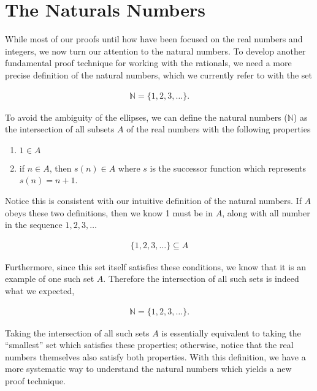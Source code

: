 \documentclass[twoside]{report}
\begin{document}
\section{The Naturals Numbers}

While most of our proofs until how have been focused on the real numbers and integers, we now turn our attention to the natural numbers. To develop another fundamental proof technique for working with the rationals, we need a more precise definition of the natural numbers, which we currently refer to with the set

\begin{align*}
	\mathbb{N} = \{ 1, 2, 3, \dots \}.
\end{align*}

To avoid the ambiguity of the ellipses, we can define the natural numbers ($\mathbb{N}$) as the intersection of all subsets $A$ of the real numbers with the following properties

\vspace{\baselineskip}
\begin{enumerate}
	\item $1 \in A$
	\item if $n \in A$, then $s(n) \in A$ where $s$ is the successor function which represents $s(n) = n + 1$.
\end{enumerate}
\vspace{\baselineskip}

Notice this is consistent with our intuitive definition of the natural numbers. If $A$ obeys these two definitions, then we know 1 must be in $A$, along with all number in the sequence $1, 2, 3, \dots$

\begin{align*}
	\{ 1, 2, 3, \dots \} \subseteq A
\end{align*}

Furthermore, since this set itself satisfies these conditions, we know that it is an example of one such set $A$. Therefore the intersection of all such sets is indeed what we expected,

\begin{align*}
	\mathbb{N} = \{ 1, 2, 3, \dots \}.
\end{align*}

Taking the intersection of all such sets $A$ is essentially equivalent to taking the ``smallest'' set which satisfies these properties; otherwise, notice that the real numbers themselves also satisfy both properties. With this definition, we have a more systematic way to understand the natural numbers which yields a new proof technique.
\end{document}
